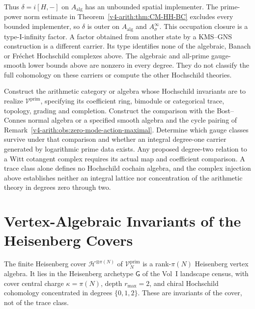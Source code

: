Thus \(\delta=i[H,-]\) on \(A_{\mathrm{alg}}\) has an unbounded
spatial implementer. The prime-power norm estimate in
Theorem~\ref{v4-arith:thm:CM-HH-BC} excludes every bounded implementer,
so \(\delta\) is outer on \(A_{\mathrm{alg}}\) and
\(A_\sigma^\infty\). This occupation
closure is a type-I-infinity factor. A factor obtained from another
state by a KMS--GNS construction is a different carrier. Its type
identifies none of the algebraic, Banach or Fr\'echet Hochschild
complexes above. The algebraic and all-prime gauge-smooth lower bounds above
are nonzero in every degree. They do not classify the full cohomology
on these carriers or compute the other Hochschild theories.

\begin{question}
\label{v4-arith:thm:H-arith-corrected}
Construct the arithmetic category or algebra whose Hochschild
invariants are to realize \(\mathcal V^{\mathrm{prim}}\), specifying
its coefficient ring, bimodule or categorical trace, topology,
grading and completion. Construct the comparison with the
Bost--Connes normal algebra or a specified smooth algebra and the
cycle pairing of Remark~\ref{v4-arith:obs:zero-mode-action-maximal}.
Determine which gauge classes survive under that comparison and
whether an integral degree-one carrier generated by logarithmic
prime data exists. Any proposed degree-two relation to a Witt
cotangent complex requires its actual map and coefficient comparison.
A trace class alone defines no Hochschild cochain algebra, and the
complex injection above establishes neither an integral lattice nor
concentration of the arithmetic theory in degrees zero through two.
\end{question}

\section{Vertex-Algebraic Invariants of the Heisenberg Covers}
\label{v4-arith:cs:new-content}

\begin{theorem}
\label{v4-arith:thm:universal-non-arithmetic}
The finite Heisenberg cover
\(\mathcal{H}^{\otimes \pi(N)}\) of
\(\mathcal{V}^{\mathrm{prim}}_{N}\) is a rank-\(\pi(N)\) Heisenberg
vertex algebra. It lies in the Heisenberg archetype \(\mathsf{G}\) of
the Vol~I landscape census, with cover central charge
\(\kappa=\pi(N)\), depth \(r_{\max}=2\), and chiral Hochschild
cohomology concentrated in degrees \(\{0,1,2\}\). These are invariants
of the cover, not of the trace class.
\end{theorem}

